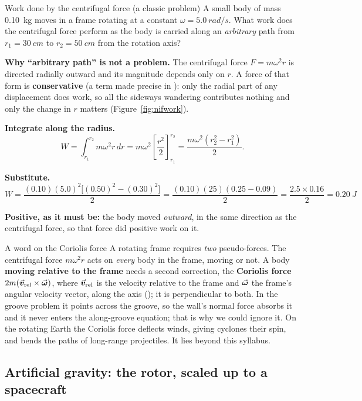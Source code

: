 \begin{exbox}{Work done by the centrifugal force \textnormal{(a classic problem)}}
A small body of mass \SI{0.10}{kg} moves in a frame rotating at a constant
$\omega=\SI{5.0}{rad/s}$. What work does the centrifugal force perform as the body is carried along an
\emph{arbitrary} path from $r_1=\SI{30}{cm}$ to $r_2=\SI{50}{cm}$ from the rotation axis?

 \textbf{Why ``arbitrary path'' is not a problem.} The centrifugal force $F=m\omega^{2}r$ is
directed radially outward and its magnitude depends only on $r$. A force of that form is
\textbf{conservative} (a term made precise in ): only the radial part of any
displacement does work, so all the sideways
wandering contributes nothing and only the change in $r$ matters (Figure~\ref{fig:nifwork}).

 \textbf{Integrate along the radius.}
\[
W=\int_{r_1}^{r_2} m\omega^{2}r\,dr
= m\omega^{2}\left[\frac{r^{2}}{2}\right]_{r_1}^{r_2}
=\frac{m\omega^{2}\left(r_2^{2}-r_1^{2}\right)}{2}.
\]

 \textbf{Substitute.}
\[
W=\frac{(0.10)(5.0)^{2}\big[(0.50)^{2}-(0.30)^{2}\big]}{2}
=\frac{(0.10)(25)(0.25-0.09)}{2}
=\frac{2.5\times0.16}{2}=\boxed{\SI{0.20}{J}}
\]

\smallskip
\textbf{Positive, as it must be:} the body moved \emph{outward}, in the same direction as the
centrifugal force, so that force did positive work on it.
\end{exbox}

\begin{remarkbox}{A word on the Coriolis force}
A rotating frame requires \emph{two} pseudo-forces. The centrifugal force $m\omega^{2}r$ acts on
\emph{every} body in the frame, moving or not. A body \textbf{moving relative to the frame} needs a
second correction, the \textbf{Coriolis force} $2m(\vec{\bm{v}}_{\text{rel}}\times\vec{\bm{\omega}})$, where $\vec{\bm{v}}_{\text{rel}}$ is the
velocity relative to the frame and $\vec{\bm{\omega}}$ the frame's angular velocity vector, along the axis
(); it is perpendicular to both. In the groove problem it points across the groove, so the wall's normal force
absorbs it and it never enters the along-groove equation; that is why we could ignore it. On the
rotating Earth the Coriolis force deflects winds, giving cyclones their spin, and bends the paths of
long-range projectiles. It lies beyond this syllabus.
\end{remarkbox}

\subsection{Artificial gravity: the rotor, scaled up to a spacecraft}

